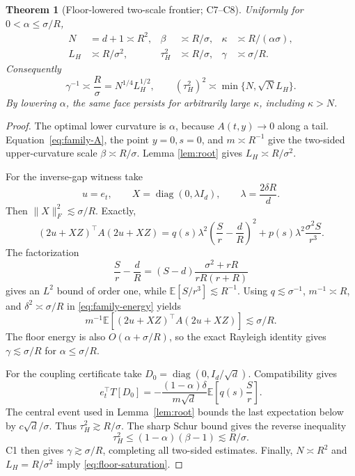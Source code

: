 \documentclass[11pt]{article}
\numberwithin{equation}{section}
\newtheorem{theorem}{Theorem}[section]
\newcommand{\E}{\mathbb E}
\begin{document}
\begin{theorem}[Floor-lowered two-scale frontier; C7--C8]
\label{thm:floor-family}
Uniformly for $0<\alpha\le\sigma/R$,
\begin{align}
 N&=d+1\asymp R^2,&
 \beta&\asymp R/\sigma,&
 \kappa&\asymp R/(\alpha\sigma),\label{eq:floor-parameters-1}\\
 L_H&\asymp R/\sigma^2,&
 \tau_H^2&\asymp R/\sigma,&
 \gamma&\asymp\sigma/R.\label{eq:floor-parameters-2}
\end{align}
Consequently
\begin{equation}\label{eq:floor-saturation}
 \gamma^{-1}\asymp\frac R\sigma
 =N^{1/4}L_H^{1/2},\qquad
 (\tau_H^2)^2\asymp\min\{N,\sqrt N L_H\}.
\end{equation}
By lowering $\alpha$, the same face persists for arbitrarily large
$\kappa$, including $\kappa>N$.
\end{theorem}

\begin{proof}
The optimal lower curvature is $\alpha$, because $A(t,y)\to0$ along a tail.
Equation~\eqref{eq:family-A}, the point $y=0,s=0$, and $m\asymp R^{-1}$ give
the two-sided upper-curvature scale $\beta\asymp R/\sigma$.  Lemma
\ref{lem:root} gives $L_H\asymp R/\sigma^2$.

For the inverse-gap witness take
\begin{equation}\label{eq:family-witness}
 u=e_t,\qquad X=\operatorname{diag}(0,\lambda I_d),\qquad
 \lambda=\frac{2\delta R}{d}.
\end{equation}
Then $\|X\|_F^2\lesssim\sigma/R$.  Exactly,
\begin{equation}\label{eq:family-energy}
 (2u+XZ)^\top A(2u+XZ)
 =q(s)\lambda^2\left(\frac S r-\frac dR\right)^2
 +p(s)\lambda^2\frac{\sigma^2S}{r^3}.
\end{equation}
The factorization
\[
 \frac S r-\frac dR
 =(S-d)\frac{\sigma^2+rR}{rR(r+R)}
\]
gives an $L^2$ bound of order one, while
$\E[S/r^3]\lesssim R^{-1}$.  Using $q\lesssim\sigma^{-1}$,
$m^{-1}\asymp R$, and $\delta^2\asymp\sigma/R$ in
\eqref{eq:family-energy} yields
\[
 m^{-1}\E[(2u+XZ)^\top A(2u+XZ)]\lesssim\sigma/R.
\]
The floor energy is also $O(\alpha+\sigma/R)$, so the exact Rayleigh identity
gives $\gamma\lesssim\sigma/R$ for $\alpha\le\sigma/R$.

For the coupling certificate take
$D_0=\operatorname{diag}(0,I_d/\sqrt d)$.  Compatibility gives
\begin{equation}\label{eq:family-T-cert}
 e_t^\top T[D_0]
 =-\frac{(1-\alpha)\delta}{m\sqrt d}
 \E\left[q(s)\frac S r\right].
\end{equation}
The central event used in Lemma~\ref{lem:root} bounds the last expectation
below by $c\sqrt d/\sigma$.  Thus $\tau_H^2\gtrsim R/\sigma$.  The sharp
Schur bound gives the reverse inequality
\[
 \tau_H^2\le(1-\alpha)(\beta-1)\lesssim R/\sigma.
\]
C1 then gives $\gamma\gtrsim\sigma/R$, completing all two-sided estimates.
Finally, $N\asymp R^2$ and
$L_H=R/\sigma^2$ imply \eqref{eq:floor-saturation}.
\end{proof}
\end{document}
